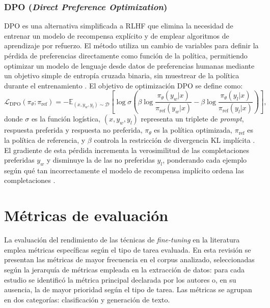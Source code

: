 \subsubsection{DPO (\textit{Direct Preference Optimization})}

DPO es una alternativa simplificada a RLHF que elimina la necesidad de entrenar un modelo de recompensa explícito y de emplear algoritmos de aprendizaje por refuerzo. El método utiliza un cambio de variables para definir la pérdida de preferencias directamente como función de la política, permitiendo optimizar un modelo de lenguaje desde datos de preferencias humanas mediante un objetivo simple de entropía cruzada binaria, sin muestrear de la política durante el entrenamiento \parencite[p.~2]{rafailov2023direct}. El objetivo de optimización DPO se define como:
\begin{equation}
\mathcal{L}_{\text{DPO}}(\pi_\theta; \pi_{\text{ref}}) = -\mathbb{E}_{(x,y_w,y_l) \sim \mathcal{D}}\left[\log \sigma\left(\beta \log \frac{\pi_\theta(y_w|x)}{\pi_{\text{ref}}(y_w|x)} - \beta \log \frac{\pi_\theta(y_l|x)}{\pi_{\text{ref}}(y_l|x)}\right)\right],
\end{equation}
donde $\sigma$ es la función logística, $(x, y_w, y_l)$ representa un triplete de \textit{prompt}, respuesta preferida y respuesta no preferida, $\pi_\theta$ es la política optimizada, $\pi_{\text{ref}}$ es la política de referencia, y $\beta$ controla la restricción de divergencia KL implícita \parencite[p.~4]{rafailov2023direct}. El gradiente de esta pérdida incrementa la verosimilitud de las completaciones preferidas $y_w$ y disminuye la de las no preferidas $y_l$, ponderando cada ejemplo según qué tan incorrectamente el modelo de recompensa implícito ordena las completaciones \parencite[p.~4]{rafailov2023direct}.

\section{Métricas de evaluación}

La evaluación del rendimiento de las técnicas de \textit{fine-tuning} en la literatura emplea métricas específicas según el tipo de tarea evaluada. En esta revisión se presentan las métricas de mayor frecuencia en el corpus analizado, seleccionadas según la jerarquía de métricas empleada en la extracción de datos: para cada estudio se identificó la métrica principal declarada por los autores o, en su ausencia, la de mayor prioridad según el tipo de tarea. Las métricas se agrupan en dos categorías: clasificación y generación de texto.

